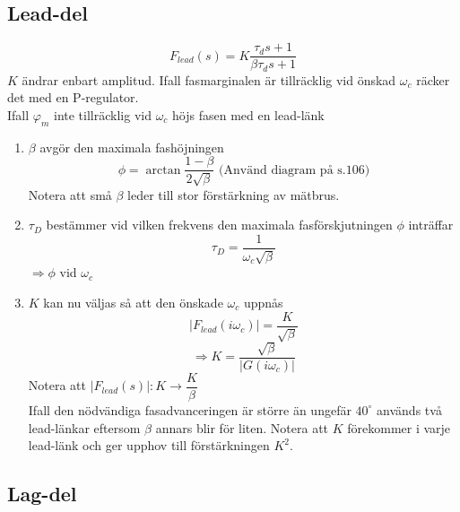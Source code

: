 \documentclass[12pt]{article}
\begin{document}
\subsection*{Lead-del}

\[F_{lead}(s) = K \frac{\tau_ds+1}{\beta\tau_ds+1}\]
$K$ ändrar enbart amplitud. Ifall fasmarginalen är tillräcklig vid önskad $\omega_c$ räcker det med en P-regulator. \\

Ifall $\varphi_m$ inte tillräcklig vid $\omega_c$ höjs fasen med en lead-länk
\begin{enumerate}
\item $\beta$ avgör den maximala fashöjningen 
  \[\phi = \arctan{\frac{1-\beta}{2\sqrt{\beta}}} \text{ (Använd diagram på s.106)}\]
Notera att små $\beta$ leder till stor förstärkning av mätbrus.
\item $\tau_D$ bestämmer vid vilken frekvens den maximala fasförskjutningen $\phi$ inträffar 
  \[\tau_D = \frac{1}{\omega_c\sqrt{\beta}}\] 
  $\Rightarrow \phi$ vid $\omega_c$
\item $K$ kan nu väljas så att den önskade $\omega_c$ uppnås 
  \[|F_{lead}(i\omega_c)| = \frac{K}{\sqrt{\beta}}\] 
  \[\Rightarrow K = \frac{\sqrt{\beta}}{|G(i\omega_c)|}\]
  Notera att $|F_{lead}(s)|: K \rightarrow \dfrac{K}{\beta}$ \\
  Ifall den nödvändiga fasadvanceringen är större än ungefär $40^{\circ}$ används två lead-länkar eftersom $\beta$ annars blir för liten. Notera att $K$ förekommer i varje lead-länk och ger upphov till förstärkningen $K^2$.
\end{enumerate}

\subsection*{Lag-del}
\end{document}
